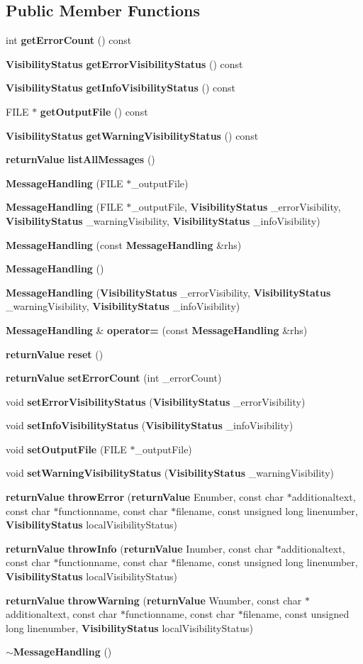 \subsection*{Public Member Functions}
\begin{DoxyCompactItemize}
\item 
int {\bf getErrorCount} () const 
\item 
{\bf VisibilityStatus} {\bf getErrorVisibilityStatus} () const 
\item 
{\bf VisibilityStatus} {\bf getInfoVisibilityStatus} () const 
\item 
FILE $\ast$ {\bf getOutputFile} () const 
\item 
{\bf VisibilityStatus} {\bf getWarningVisibilityStatus} () const 
\item 
{\bf returnValue} {\bf listAllMessages} ()
\item 
{\bf MessageHandling} (FILE $\ast$\_\-outputFile)
\item 
{\bf MessageHandling} (FILE $\ast$\_\-outputFile, {\bf VisibilityStatus} \_\-errorVisibility, {\bf VisibilityStatus} \_\-warningVisibility, {\bf VisibilityStatus} \_\-infoVisibility)
\item 
{\bf MessageHandling} (const {\bf MessageHandling} \&rhs)
\item 
{\bf MessageHandling} ()
\item 
{\bf MessageHandling} ({\bf VisibilityStatus} \_\-errorVisibility, {\bf VisibilityStatus} \_\-warningVisibility, {\bf VisibilityStatus} \_\-infoVisibility)
\item 
{\bf MessageHandling} \& {\bf operator=} (const {\bf MessageHandling} \&rhs)
\item 
{\bf returnValue} {\bf reset} ()
\item 
{\bf returnValue} {\bf setErrorCount} (int \_\-errorCount)
\item 
void {\bf setErrorVisibilityStatus} ({\bf VisibilityStatus} \_\-errorVisibility)
\item 
void {\bf setInfoVisibilityStatus} ({\bf VisibilityStatus} \_\-infoVisibility)
\item 
void {\bf setOutputFile} (FILE $\ast$\_\-outputFile)
\item 
void {\bf setWarningVisibilityStatus} ({\bf VisibilityStatus} \_\-warningVisibility)
\item 
{\bf returnValue} {\bf throwError} ({\bf returnValue} Enumber, const char $\ast$additionaltext, const char $\ast$functionname, const char $\ast$filename, const unsigned long linenumber, {\bf VisibilityStatus} localVisibilityStatus)
\item 
{\bf returnValue} {\bf throwInfo} ({\bf returnValue} Inumber, const char $\ast$additionaltext, const char $\ast$functionname, const char $\ast$filename, const unsigned long linenumber, {\bf VisibilityStatus} localVisibilityStatus)
\item 
{\bf returnValue} {\bf throwWarning} ({\bf returnValue} Wnumber, const char $\ast$additionaltext, const char $\ast$functionname, const char $\ast$filename, const unsigned long linenumber, {\bf VisibilityStatus} localVisibilityStatus)
\item 
{\bf $\sim$MessageHandling} ()
\end{DoxyCompactItemize}
